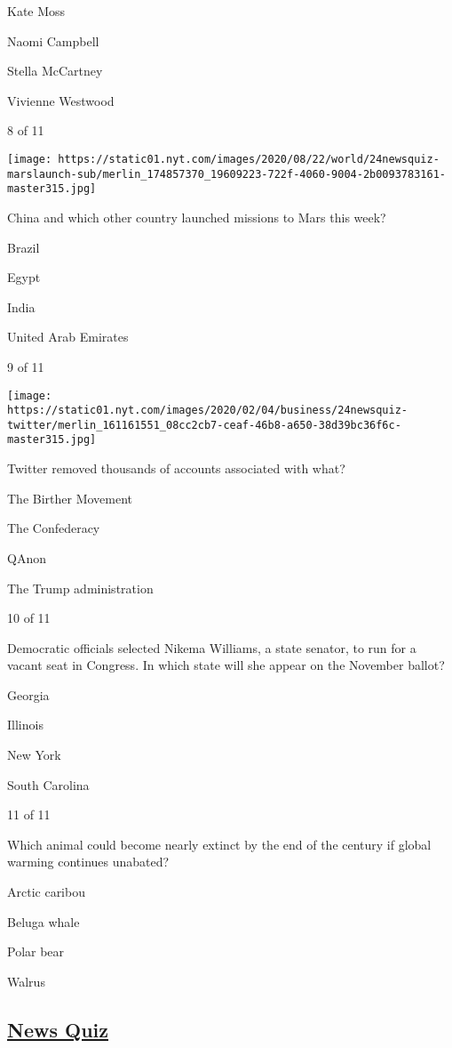 Kate Moss

Naomi Campbell

Stella McCartney

Vivienne Westwood

8 of 11

\texttt{[image: https://static01.nyt.com/images/2020/08/22/world/24newsquiz-marslaunch-sub/merlin\_174857370\_19609223-722f-4060-9004-2b0093783161-master315.jpg]}

China and which other country launched missions to Mars this week?

Brazil

Egypt

India

United Arab Emirates

9 of 11

\texttt{[image: https://static01.nyt.com/images/2020/02/04/business/24newsquiz-twitter/merlin\_161161551\_08cc2cb7-ceaf-46b8-a650-38d39bc36f6c-master315.jpg]}

Twitter removed thousands of accounts associated with what?

The Birther Movement

The Confederacy

QAnon

The Trump administration

10 of 11

Democratic officials selected Nikema Williams, a state senator, to run
for a vacant seat in Congress. In which state will she appear on the
November ballot?

Georgia

Illinois

New York

South Carolina

11 of 11

Which animal could become nearly extinct by the end of the century if
global warming continues unabated?

Arctic caribou

Beluga whale

Polar bear

Walrus

\hypertarget{news-quiz}{%
\subsection{\texorpdfstring{\href{https://www.nytimes.com/spotlight/news-quiz}{News
Quiz}}{News Quiz}}\label{news-quiz}}

